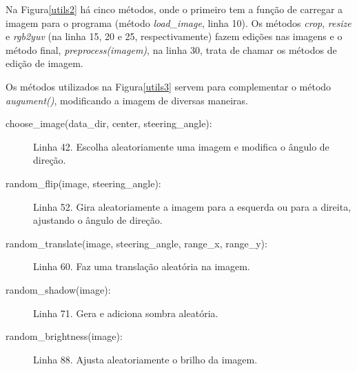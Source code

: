 Na Figura\ref{utils2} há cinco métodos, onde o primeiro tem a função de carregar a imagem para o programa (método \textit{load\_image}, linha 10). Os métodos \textit{crop}, \textit{resize} e \textit{rgb2yuv} (na linha 15, 20 e 25, respectivamente) fazem edições nas imagens e o método final, \textit{preprocess(imagem)}, na linha 30, trata de chamar os métodos de edição de imagem.

\begin{figure}[H]
	\centering
\end{figure}

Os métodos utilizados na Figura\ref{utils3} servem para complementar o método \textit{augument()}, modificando a imagem de diversas maneiras.
\begin{description}
    \item[choose\_image(data\_dir, center, steering\_angle):] Linha 42. Escolha aleatoriamente uma imagem e modifica o ângulo de direção.
    \item[random\_flip(image, steering\_angle):] Linha 52. Gira aleatoriamente a imagem para a esquerda ou para a direita, ajustando o ângulo de direção.
    \item[random\_translate(image, steering\_angle, range\_x, range\_y):] Linha 60. Faz uma translação aleatória na imagem.
    \item[random\_shadow(image):] Linha 71. Gera e adiciona sombra aleatória.
    \item[random\_brightness(image):] Linha 88. Ajusta aleatoriamente o brilho da imagem.
\end{description}

